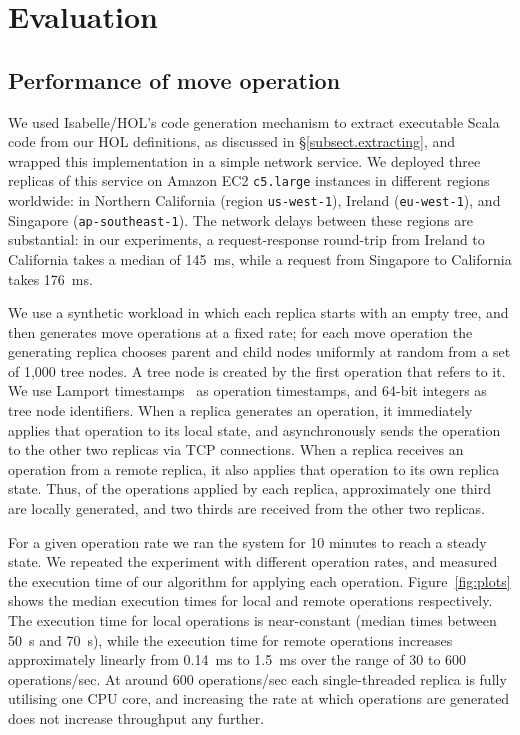 \documentclass[10pt,journal,compsoc]{IEEEtran}
\begin{document}
\section{Evaluation}\label{sec:evaluation}

\subsection{Performance of move operation}

We used Isabelle/HOL's code generation mechanism to extract executable Scala code from our HOL definitions, as discussed in \S\ref{subsect.extracting}, and wrapped this implementation in a simple network service.
We deployed three replicas of this service on Amazon EC2 \texttt{c5.large} instances in different regions worldwide: in Northern California (region \texttt{us-west-1}), Ireland (\texttt{eu-west-1}), and Singapore (\texttt{ap-southeast-1}).
The network delays between these regions are substantial: in our experiments, a request-response round-trip from Ireland to California takes a median of 145~ms, while a request from Singapore to California takes 176~ms.

We use a synthetic workload in which each replica starts with an empty tree, and then generates move operations at a fixed rate; for each move operation the generating replica chooses parent and child nodes uniformly at random from a set of 1,000 tree nodes.
A tree node is created by the first operation that refers to it.
We use Lamport timestamps~\cite{Lamport:1978jq} as operation timestamps, and 64-bit integers as tree node identifiers.
When a replica generates an operation, it immediately applies that operation to its local state, and asynchronously sends the operation to the other two replicas via TCP connections.
When a replica receives an operation from a remote replica, it also applies that operation to its own replica state.
Thus, of the operations applied by each replica, approximately one third are locally generated, and two thirds are received from the other two replicas.

For a given operation rate we ran the system for 10 minutes to reach a steady state.
We repeated the experiment with different operation rates, and measured the execution time of our algorithm for applying each operation.
Figure~\ref{fig:plots} shows the median execution times for local and remote operations respectively.
The execution time for local operations is near-constant (median times between 50~{\textmu}s and 70~{\textmu}s), while the execution time for remote operations increases approximately linearly from 0.14~ms to 1.5~ms over the range of 30 to 600 operations/sec.
At around 600 operations/sec each single-threaded replica is fully utilising one CPU core, and increasing the rate at which operations are generated does not increase throughput any further.
\end{document}
